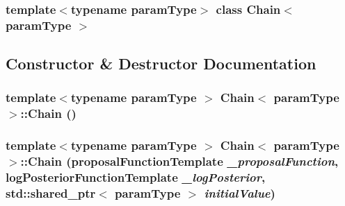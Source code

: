 \subsubsection*{template$<$typename paramType$>$ class Chain$<$ paramType $>$}



\subsection{Constructor \& Destructor Documentation}
\hypertarget{classChain_aa81d495a22785798908076ef5e3191a6}{
\subsubsection[{Chain}]{\setlength{\rightskip}{0pt plus 5cm}template$<$typename paramType $>$ {\bf Chain}$<$ paramType $>$::{\bf Chain} ()}}
\label{classChain_aa81d495a22785798908076ef5e3191a6}
\hypertarget{classChain_ad4bad1f133e8be218275f2b900146840}{
\subsubsection[{Chain}]{\setlength{\rightskip}{0pt plus 5cm}template$<$typename paramType $>$ {\bf Chain}$<$ paramType $>$::{\bf Chain} (proposalFunctionTemplate {\em \_\-proposalFunction}, \/  logPosteriorFunctionTemplate {\em \_\-logPosterior}, \/  std::shared\_\-ptr$<$ paramType $>$ {\em initialValue})}}
\label{classChain_ad4bad1f133e8be218275f2b900146840}


